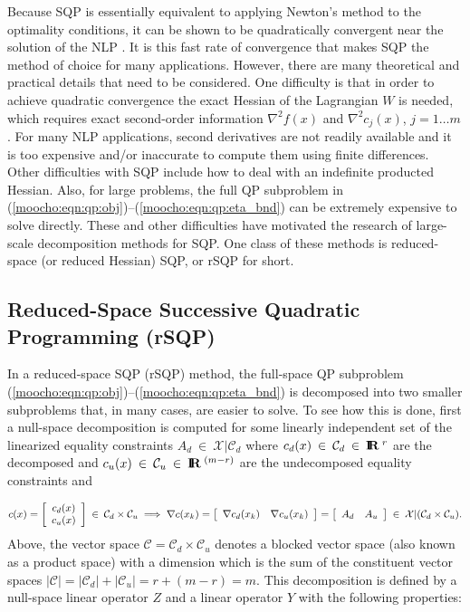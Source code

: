 \documentclass[pdf,ps2pdf,11pt]{SANDreport}
\begin{document}
Because SQP is essentially equivalent to applying Newton's method to the
optimality conditions, it can be shown to be quadratically convergent near the
solution of the NLP {}\cite{ref:nocedal_overton_1985}.  It is this fast rate
of convergence that makes SQP the method of choice for many applications.
However, there are many theoretical and practical details that need to be
considered.  One difficulty is that in order to achieve quadratic convergence
the exact Hessian of the Lagrangian $W$ is needed, which requires exact
second-order information $\nabla^2 f(x)$ and $\nabla^2 c_j(x)$, $j = 1 \ldots
m$.  For many NLP applications, second derivatives are not readily available
and it is too expensive and/or inaccurate to compute them using finite
differences.  Other difficulties with SQP include how to deal with an
indefinite producted Hessian.  Also, for large problems, the full QP
subproblem in (\ref{moocho:eqn:qp:obj})--(\ref{moocho:eqn:qp:eta_bnd}) can be
extremely expensive to solve directly.  These and other difficulties have
motivated the research of large-scale decomposition methods for SQP.  One
class of these methods is reduced-space (or reduced Hessian) SQP, or rSQP for
short.

%
\subsection{Reduced-Space Successive Quadratic Programming (rSQP)}
\label{moocho:sec:rSQP}
%

In a reduced-space SQP (rSQP) method, the full-space QP subproblem
(\ref{moocho:eqn:qp:obj})--(\ref{moocho:eqn:qp:eta_bnd}) is decomposed into
two smaller subproblems that, in many cases, are easier to solve.  To see how
this is done, first a null-space decomposition {}\cite[Section
18.3]{ref:nocedal_wright_1999} is computed for some linearly independent set
of the linearized equality constraints $A_d \:\in\:\mathcal{X}|\mathcal{C}_d$
where $c_d(x)\:\in\:\mathcal{C}_d\:\in\:\mbox{\textbf{I}}\hspace{-0.6ex}\mbox{\textbf{R}}\:^{r}$ are the decomposed and
$c_u(x)\:\in\:\mathcal{C}_u\:\in\:\mbox{\textbf{I}}\hspace{-0.6ex}\mbox{\textbf{R}}\:^{(m-r)}$ are the undecomposed equality
constraints and

{\bsinglespace
\begin{equation}
c(x) =
{\bmat{c} c_d(x) \\ c_u(x) \emat} \:\in\:\mathcal{C}_d \times \mathcal{C}_u
\; \Longrightarrow \;
\nabla c(x_k) = {\bmat{cc} \nabla c_d(x_k) & \nabla c_u(x_k) \emat}
= {\bmat{cc} A_d & A_u \emat} \:\in\:\mathcal{X}|(\mathcal{C}_d \times \mathcal{C}_u).
\label{moocho:eqn:lin_indep_constr}
\end{equation}
\esinglespace}
%
Above, the vector space $\mathcal{C} = \mathcal{C}_d \times \mathcal{C}_u$
denotes a blocked vector space (also known as a product space) with a
dimension which is the sum of the constituent vector spaces $|\mathcal{C}| =
|\mathcal{C}_d| + |\mathcal{C}_u| = r + (m - r) = m$.  This decomposition is
defined by a null-space linear operator $Z$ and a linear operator $Y$ with the following
properties:
\end{document}
